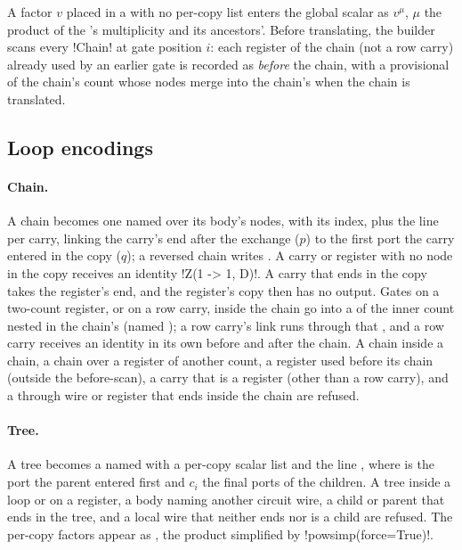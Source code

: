 A factor $v$ placed in a \bbox{} with no per-copy list enters the global scalar as
$v^{\mu}$, $\mu$ the product of the \bbox's multiplicity and its ancestors'. Before translating,
the builder scans every \py!Chain! at gate position $i$: each register of the chain (not a row
carry) already used by an earlier gate is recorded as \emph{before} the chain, with a
provisional \bbox{}  of the chain's count whose nodes merge into the chain's
\bbox{} when the chain is translated.

\subsection{Loop encodings}

\paragraph{Chain.} A chain becomes one named \bbox{} over its body's nodes, with its index,
plus the line  per carry, linking the carry's end after the exchange
($p$) to the first port the carry entered in the copy ($q$); a reversed chain writes
. A carry or register with no node in the copy receives an identity
\azx!Z(1 -> 1, D)!. A carry that ends in the copy takes the register's end, and the register's
copy then has no output. Gates on a two-count register, or on a row carry, inside the chain go
into a \bbox{} of the inner count nested in the chain's (named ); a row carry's
link runs through that \bbox, and a row carry receives an identity in its own \bbox{} before and
after the chain. A chain inside a chain, a chain over a register of another count, a register
used before its chain (outside the before-scan), a carry that is a register (other than a row
carry), and a through wire or register that ends inside the chain are refused.

\paragraph{Tree.} A tree becomes a named \bbox{} with a per-copy scalar list and the line
, where  is the port the
parent entered first and $c_i$ the final ports of the children. A tree inside a loop or on a
register, a body naming another circuit wire, a child or parent that ends in the tree, and a
local wire that neither ends nor is a child are refused. The per-copy factors appear as
, the product simplified by \py!powsimp(force=True)!.

